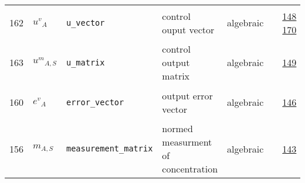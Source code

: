 \begin{longtable}{|p{1cm}|p{2.5cm}|p{4.5cm}|p{8cm}|p{3.0cm}|p{3cm}|p{1cm}|}
            162
             & \hypertarget{"v:162"}{ $ {{u^{v}}}{_{A}} $}
             & \verb|u_vector|
             & control ouput vector
             & \begin{lay}algebraic \end{lay}
             & $  $
             &                 \hyperlink{"e:148"}{ 148 }
                                 \hyperlink{"e:170"}{ 170 }
                 \\
            163
             & \hypertarget{"v:163"}{ $ {{u^{m}}}{_{A, S}} $}
             & \verb|u_matrix|
             & control output matrix
             & \begin{lay}algebraic \end{lay}
             & $  $
             &                 \hyperlink{"e:149"}{ 149 }
                 \\
            160
             & \hypertarget{"v:160"}{ $ {{e^{v}}}{_{A}} $}
             & \verb|error_vector|
             & output error vector
             & \begin{lay}algebraic \end{lay}
             & $  $
             &                 \hyperlink{"e:146"}{ 146 }
                 \\
            156
             & \hypertarget{"v:156"}{ $ {m}{_{A, S}} $}
             & \verb|measurement_matrix|
             & normed measurment of concentration
             & \begin{lay}algebraic \end{lay}
             & $  $
             &                 \hyperlink{"e:143"}{ 143 }
                 \\
    \end{longtable}